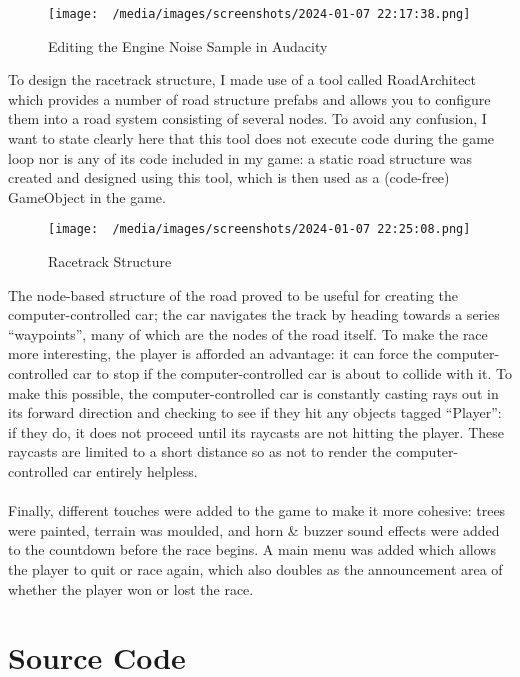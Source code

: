 \documentclass[a4paper,11pt]{article}
\newenvironment{code}{\captionsetup{type=listing}}{}
\begin{document}
\begin{figure}[H]
    \centering
    \texttt{[image: ~/media/images/screenshots/2024-01-07 22:17:38.png]}
    \caption{Editing the Engine Noise Sample in Audacity}
\end{figure}

To design the racetrack structure, I made use of a tool called RoadArchitect which provides a number of 
road structure prefabs and allows you to configure them into a road system consisting of several nodes.
To avoid any confusion, I want to state clearly here that this tool does not execute code during the game loop 
nor is any of its code included in my game: a static road structure was created and designed using this tool, 
which is then used as a (code-free) GameObject in the game.

\begin{figure}[H]
    \centering
    \texttt{[image: ~/media/images/screenshots/2024-01-07 22:25:08.png]}
    \caption{Racetrack Structure}
\end{figure}

The node-based structure of the road proved to be useful for creating the computer-controlled car; the car 
navigates the track by heading towards a series ``waypoints'', many of which are the nodes of the road itself.
To make the race more interesting, the player is afforded an advantage: it can force the computer-controlled car
to stop if the computer-controlled car is about to collide with it. 
To make this possible, the computer-controlled car is constantly casting rays out in its forward direction and 
checking to see if they hit any objects tagged ``Player'': if they do, it does not proceed until its raycasts 
are not hitting the player.
These raycasts are limited to a short distance so as not to render the computer-controlled car entirely helpless.
\\\\
Finally, different touches were added to the game to make it more cohesive: trees were painted, terrain was
moulded, and horn \& buzzer sound effects were added to the countdown before the race begins.
A main menu was added which allows the player to quit or race again, which also doubles as the announcement area 
of whether the player won or lost the race.

\section{Source Code}
\begin{code}
\inputminted[texcl, mathescape, linenos, breaklines, frame=single]{csharp}{../Assets/EngineSound.cs}
\caption{\texttt{EngineSound.cs}}
\end{code}
\end{document}
